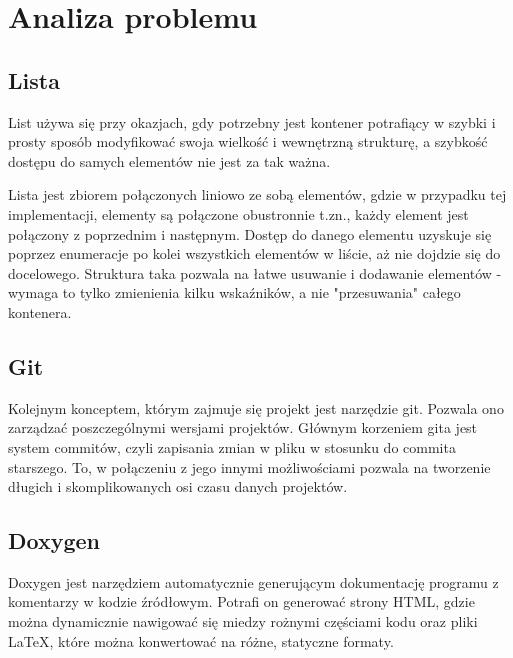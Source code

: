 \newpage
\section{Analiza problemu}		%

\subsection{Lista}

List używa się przy okazjach, gdy potrzebny jest kontener potrafiący w szybki i prosty sposób modyfikować swoja wielkość i wewnętrzną strukturę, a szybkość dostępu do samych elementów nie jest za tak ważna.

Lista jest zbiorem połączonych liniowo ze sobą elementów, gdzie w przypadku tej implementacji, elementy są połączone obustronnie t.zn., każdy element jest połączony z poprzednim i następnym. Dostęp do danego elementu uzyskuje się poprzez enumeracje po kolei wszystkich elementów w liście, aż nie dojdzie się do docelowego. Struktura taka pozwala na łatwe usuwanie i dodawanie elementów - wymaga to tylko zmienienia kilku wskaźników, a nie "przesuwania" całego kontenera. 

\subsection{Git}
Kolejnym konceptem, którym zajmuje się projekt jest narzędzie git. Pozwala ono zarządzać poszczególnymi wersjami projektów. Głównym korzeniem gita jest system commitów, czyli zapisania zmian w pliku w stosunku do commita starszego. To, w połączeniu z jego innymi możliwościami pozwala na tworzenie długich i skomplikowanych osi czasu danych projektów. 

\subsection{Doxygen}
Doxygen jest narzędziem automatycznie generującym dokumentację programu z komentarzy w kodzie źródłowym. Potrafi on generować strony HTML, gdzie można dynamicznie nawigować się miedzy rożnymi częściami kodu oraz pliki \LaTeX, które można konwertować na różne, statyczne formaty.
